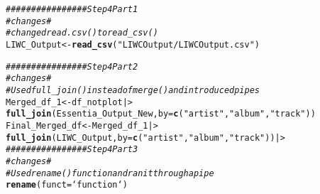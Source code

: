 \documentclass{article}\usepackage[]{graphicx}\usepackage[]{xcolor}
\makeatletter
\newcommand{\hlsng}[1]{\textcolor[rgb]{0.192,0.494,0.8}{#1}}%
\newcommand{\hlcom}[1]{\textcolor[rgb]{0.678,0.584,0.686}{\textit{#1}}}%
\newcommand{\hldef}[1]{\textcolor[rgb]{0.345,0.345,0.345}{#1}}%
\newcommand{\hlkwb}[1]{\textcolor[rgb]{0.69,0.353,0.396}{#1}}%
\newcommand{\hlkwc}[1]{\textcolor[rgb]{0.333,0.667,0.333}{#1}}%
\newcommand{\hlkwd}[1]{\textcolor[rgb]{0.737,0.353,0.396}{\textbf{#1}}}%
\newenvironment{kframe}{%
 \def\at@end@of@kframe{}%
 \ifinner\ifhmode%
  \def\at@end@of@kframe{\end{minipage}}%
  \begin{minipage}{\columnwidth}%
 \fi\fi%
 \def\FrameCommand##1{\hskip\@totalleftmargin \hskip-\fboxsep
 \colorbox{shadecolor}{##1}\hskip-\fboxsep
     \hskip-\linewidth \hskip-\@totalleftmargin \hskip\columnwidth}%
 \MakeFramed {\advance\hsize-\width
   \@totalleftmargin\z@ \linewidth\hsize
   \@setminipage}}%
 {\par\unskip\endMakeFramed%
 \at@end@of@kframe}
\newenvironment{knitrout}{}{} %
\makeatother
\begin{document}
\begin{enumerate}
\begin{knitrout}
\begin{kframe}
\begin{alltt}
\hlcom{################ Step 4 Part 1}
\hlcom{#changes#}
\hlcom{#changed read.csv() to read_csv()}
\hldef{LIWC_Output} \hlkwb{<-} \hlkwd{read_csv}\hldef{(}\hlsng{"LIWCOutput/LIWCOutput.csv"}\hldef{)}

\hlcom{################ Step 4 Part 2}
\hlcom{#changes#}
\hlcom{#Used full_join() instead of merge() and introduced pipes}
\hldef{Merged_df_1} \hlkwb{<-} \hldef{df_notplot |>}
  \hlkwd{full_join}\hldef{(Essentia_Output_New,} \hlkwc{by} \hldef{=} \hlkwd{c}\hldef{(}\hlsng{"artist"}\hldef{,} \hlsng{"album"}\hldef{,} \hlsng{"track"}\hldef{))}
\hldef{Final_Merged_df} \hlkwb{<-} \hldef{Merged_df_1 |>}
  \hlkwd{full_join}\hldef{(LIWC_Output,} \hlkwc{by} \hldef{=} \hlkwd{c}\hldef{(}\hlsng{"artist"}\hldef{,} \hlsng{"album"}\hldef{,} \hlsng{"track"}\hldef{)) |>}
\hlcom{################ Step 4 Part 3}
\hlcom{#changes#}
\hlcom{#Used rename() function and ran it through a pipe}
    \hlkwd{rename}\hldef{(}\hlkwc{funct} \hldef{= `function`)}
\end{alltt}
\end{kframe}
\end{knitrout}
\end{enumerate}

\end{document}
